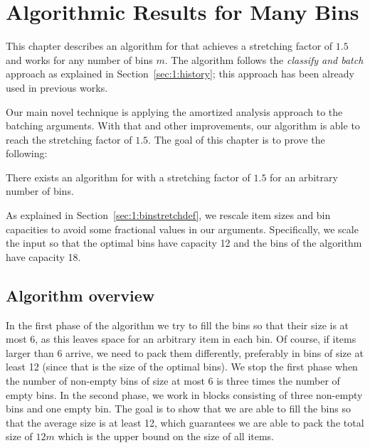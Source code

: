 \openright
\chapter{Algorithmic Results for Many Bins}\label{chap:manybins}


This chapter describes an algorithm for \binstretch that achieves a
stretching factor of $1.5$ and works for any number of bins $m$. The
algorithm follows the \emph{classify and batch} approach as explained
in Section~\ref{sec:1:history}; this approach has been already used in
previous works.

Our main novel technique is applying the amortized analysis approach
to the batching arguments. With that and other improvements, our
algorithm is able to reach the stretching factor of $1.5$. The
goal of this chapter is to prove the following:

\begin{thm}\label{thm:onepointfive}
There exists an algorithm for \binstretch with a stretching factor of
$1.5$ for an arbitrary number of bins.
\end{thm}

As explained in Section~\ref{sec:1:binstretchdef}, we rescale item
sizes and bin capacities to avoid some fractional values in our
arguments. Specifically, we scale the input so that the optimal bins
have capacity 12 and the bins of the algorithm have capacity 18.


\section{Algorithm overview}\label{chap:2:overview}

In the first phase of the algorithm we try to fill the bins so that
their size is at most 6, as this leaves space for an arbitrary item in
each bin. Of course, if items larger than 6 arrive, we need to pack
them differently, preferably in bins of size at least 12 (since that
is the size of the optimal bins). We stop the first phase when the
number of non-empty bins of size at most 6 is three times the number
of empty bins. In the second phase, we work in blocks consisting of
three non-empty bins and one empty bin. The goal is to show that we
are able to fill the bins so that the average size is at least 12,
which guarantees we are able to pack the total size of $12m$ which is
the upper bound on the size of all items.

